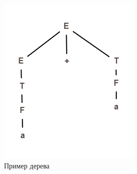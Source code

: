 \documentclass{beamer}
\begin{document}
\begin{frame}
\begin{columns}
    \begin{figure}[!tbp]
          \raggedleft
          \begin{minipage}[b]{0.7\textwidth}
          \includegraphics[width=\textwidth]{theorem_ex.png}
          \end{minipage}
          \caption{Пример дерева}
          \end{figure}
    \end{columns}
    
	\end{frame}
\end{document}
